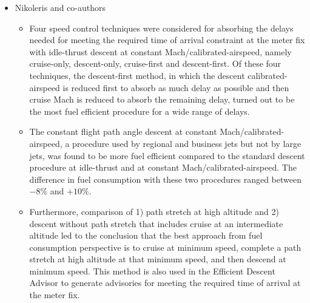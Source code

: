 \documentclass{aer1315-pretty}
\begin{document}
\begin{itemize}
\item Nikoleris and co-authors \cite{Niko:2012} 
\begin{itemize}
\item Four speed control techniques were considered for absorbing the delays needed for meeting the required time of arrival constraint at the meter fix with idle-thrust descent at constant Mach/calibrated-airspeed, namely cruise-only, descent-only, cruise-first and descent-first. Of these four techniques, the descent-first method, in which
the descent calibrated-airspeed is reduced first to absorb as much delay as possible and then cruise Mach is reduced to absorb the remaining delay, turned out to be the most fuel efficient procedure for a wide range of delays.
\item  The constant flight path angle descent at constant Mach/calibrated-airspeed, a procedure used by regional and business jets but not by large jets, was found to be more fuel efficient compared to the standard descent procedure at idle-thrust and at constant Mach/calibrated-airspeed. The difference in fuel consumption with these two procedures ranged between $-8\%$ and $+10\%$.
\item  Furthermore, comparison of 1) path stretch at high altitude and 2) descent without path stretch that includes cruise at an intermediate altitude led to the conclusion that the best approach from fuel consumption perspective is to cruise at minimum speed, complete a path stretch at high altitude at that minimum speed, and then descend at minimum speed. This method is also used in the Efficient Descent Advisor to generate advisories for meeting the required time of arrival at the meter fix.
\end{itemize}




\end{itemize}
\end{document}
